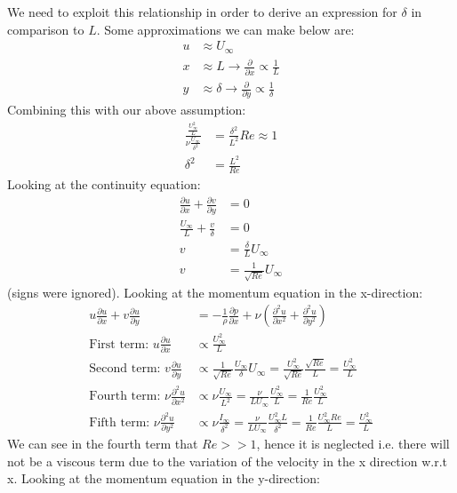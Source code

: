 \documentclass[class=report, crop=false, 12pt,a4paper]{standalone}
\begin{document}
We need to exploit this relationship in order to derive an expression for $\delta$ in comparison to $L$. Some approximations we can make below are:
\begin{align}
  u &\approx U_\infty\\
  x &\approx L \rightarrow \frac{\partial}{\partial x} \propto \frac{1}{L}\\
  y &\approx \delta \rightarrow \frac{\partial}{\partial y} \propto \frac{1}{\delta}
\end{align}
Combining this with our above assumption:
\begin{align}
  \frac{\frac{U_\infty^2}{L}}{\nu \frac{U_\infty}{\delta^2}} &= \frac{\delta^2}{L^2} Re \approx 1\\
  \delta^2 &= \frac{L^2}{Re}
\end{align}
Looking at the continuity equation:
\begin{align}
  \frac{\partial u}{\partial x} + \frac{\partial v}{\partial y} &= 0\\
  \frac{U_\infty}{L} + \frac{v}{\delta} &= 0\\
  v &= \frac{\delta}{L}U_\infty\\
  v &= \frac{1}{\sqrt{Re}} U_\infty
\end{align}
(signs were ignored). Looking at the momentum equation in the x-direction:
\begin{align}
  u\frac{\partial u}{\partial x} + v \frac{\partial u }{\partial y} &= - \frac{1}{\rho} \frac{\partial p}{\partial x} + \nu \left(\frac{\partial^2 u}{\partial x^2} + \frac{\partial^2 u}{\partial y^2}\right)\\
  \textrm{First term: } u\frac{\partial u}{\partial x} &\propto \frac{U_\infty^2}{L}\\
  \textrm{Second term: } v\frac{\partial u}{\partial y} &\propto \frac{1}{\sqrt{Re}} \frac{U_\infty}{\delta} U_\infty = \frac{U_\infty^2}{\sqrt{Re}} \frac{\sqrt{Re}}{L} = \frac{U_\infty^2}{L}\\
  \textrm{Fourth term: } \nu \frac{\partial^2 u}{\partial x^2} &\propto \nu \frac{U_\infty}{L^2} = \frac{\nu}{L U_\infty} \frac{U_\infty^2}{L} = \frac{1}{Re} \frac{U_\infty^2}{L}\\
  \textrm{Fifth term: } \nu \frac{\partial^2 u}{\partial y^2} &\propto \nu \frac{I_\infty}{\delta^2} = \frac{\nu}{L U_\infty} \frac{U_\infty^2 L}{\delta^2} = \frac{1}{Re} \frac{U_\infty^2 Re}{L} = \frac{U_\infty^2}{L}
\end{align}
We can see in the fourth term that $Re >> 1$, hence it is neglected i.e. there will not be a viscous term due to the variation of the velocity in the x direction w.r.t x. Looking at the momentum equation in the y-direction:
\end{document}
